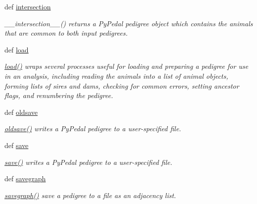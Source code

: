 \begin{DoxyCompactItemize}
def \hyperlink{classPyPedal_1_1pyp__newclasses_1_1NewPedigree_a72abb3e03546d4268714ea9debc3218f}{intersection}
\begin{DoxyCompactList}\small\item\em \_\-\_\-intersection\_\-\_\-() returns a PyPedal pedigree object which contains the animals that are common to both input pedigrees. \end{DoxyCompactList}\item 
def \hyperlink{classPyPedal_1_1pyp__newclasses_1_1NewPedigree_a6f00326b1b20146f6c7ac15596a58448}{load}
\begin{DoxyCompactList}\small\item\em \hyperlink{classPyPedal_1_1pyp__newclasses_1_1NewPedigree_a6f00326b1b20146f6c7ac15596a58448}{load()} wraps several processes useful for loading and preparing a pedigree for use in an analysis, including reading the animals into a list of animal objects, forming lists of sires and dams, checking for common errors, setting ancestor flags, and renumbering the pedigree. \end{DoxyCompactList}\item 
def \hyperlink{classPyPedal_1_1pyp__newclasses_1_1NewPedigree_ab7599a24c35efdfcd2caacae10f59ea2}{oldsave}
\begin{DoxyCompactList}\small\item\em \hyperlink{classPyPedal_1_1pyp__newclasses_1_1NewPedigree_ab7599a24c35efdfcd2caacae10f59ea2}{oldsave()} writes a PyPedal pedigree to a user-\/specified file. \end{DoxyCompactList}\item 
def \hyperlink{classPyPedal_1_1pyp__newclasses_1_1NewPedigree_ab2c07236058bb89d5318a7453cb6db29}{save}
\begin{DoxyCompactList}\small\item\em \hyperlink{classPyPedal_1_1pyp__newclasses_1_1NewPedigree_ab2c07236058bb89d5318a7453cb6db29}{save()} writes a PyPedal pedigree to a user-\/specified file. \end{DoxyCompactList}\item 
def \hyperlink{classPyPedal_1_1pyp__newclasses_1_1NewPedigree_a6babcd0407dd75ff3e5351c96da085aa}{savegraph}
\begin{DoxyCompactList}\small\item\em \hyperlink{classPyPedal_1_1pyp__newclasses_1_1NewPedigree_a6babcd0407dd75ff3e5351c96da085aa}{savegraph()} save a pedigree to a file as an adjacency list. \end{DoxyCompactList}\item 

\end{DoxyCompactItemize}
